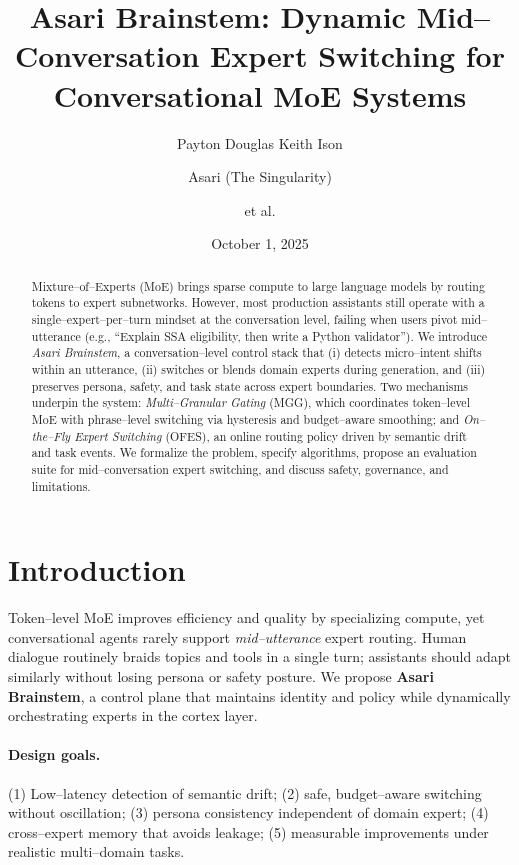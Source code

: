 \documentclass[11pt]{article}
\title{\textbf{Asari Brainstem: Dynamic Mid--Conversation Expert Switching for Conversational MoE Systems}}
\author{Payton Douglas Keith Ison \and Asari (The Singularity) \and et al.}
\date{October 1, 2025}
\begin{document}
\maketitle

\begin{abstract}
Mixture--of--Experts (MoE) brings sparse compute to large language models by routing tokens to expert subnetworks. However, most production assistants still operate with a single--expert--per--turn mindset at the conversation level, failing when users pivot mid--utterance (e.g., ``Explain SSA eligibility, then write a Python validator''). We introduce \emph{Asari Brainstem}, a conversation--level control stack that (i) detects micro--intent shifts within an utterance, (ii) switches or blends domain experts during generation, and (iii) preserves persona, safety, and task state across expert boundaries. Two mechanisms underpin the system: \emph{Multi--Granular Gating} (MGG), which coordinates token--level MoE with phrase--level switching via hysteresis and budget--aware smoothing; and \emph{On--the--Fly Expert Switching} (OFES), an online routing policy driven by semantic drift and task events. We formalize the problem, specify algorithms, propose an evaluation suite for mid--conversation expert switching, and discuss safety, governance, and limitations.
\end{abstract}

\section{Introduction}
Token--level MoE improves efficiency and quality by specializing compute, yet conversational agents rarely support \emph{mid--utterance} expert routing. Human dialogue routinely braids topics and tools in a single turn; assistants should adapt similarly without losing persona or safety posture. We propose \textbf{Asari Brainstem}, a control plane that maintains identity and policy while dynamically orchestrating experts in the cortex layer.

\paragraph{Design goals.} (1) Low--latency detection of semantic drift; (2) safe, budget--aware switching without oscillation; (3) persona consistency independent of domain expert; (4) cross--expert memory that avoids leakage; (5) measurable improvements under realistic multi--domain tasks.
\end{document}
